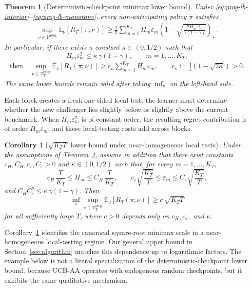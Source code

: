 \documentclass[
  12pt]{article}
\newtheorem{theorem}{Theorem}
\newtheorem{corollary}{Corollary}
\begin{document}
\begin{theorem}[Deterministic-checkpoint minimax lower bound]
\label{thm:prog-lb-general}
Under \eqref{eq:prog-lb-interior}--\eqref{eq:prog-lb-monotone}, every non-anticipating policy
$\pi$ satisfies
\begin{align}
\sup_{\nu\in\mathcal V_T^{\mathrm{prog}}}
\mathbb E_\nu[R_T(\pi;\nu)]
\ge
\frac12
\sum_{m=1}^{K_T}
H_m\varepsilon_m
\left(
1-
\sqrt{
\frac{2H_m\varepsilon_m^2}{\gamma(1-\gamma)}
}
\right)_+ .
    \label{eq:prog-lb-kl-simple}
\end{align}
In particular, if there exists a constant $\kappa\in(0,1/2)$ such that
\[
H_m\varepsilon_m^2
\le
\kappa\,\gamma(1-\gamma),
\qquad
m=1,\dots,K_T,
\]
\begin{align}
    \text{then}\quad \sup_{\nu\in\mathcal V_T^{\mathrm{prog}}}
\mathbb E_\nu[R_T(\pi;\nu)]
\ge
c_\kappa
\sum_{m=1}^{K_T} H_m\varepsilon_m,
\qquad
c_\kappa:=\frac12(1-\sqrt{2\kappa})>0.
\label{eq:prog-lb-clean}
\end{align}
The same lower bounds remain valid after taking $\inf_\pi$ on the left-hand side.
\end{theorem}

Each block creates a fresh one-sided local test: the learner must determine whether the new
challenger lies slightly below or slightly above the current benchmark. When
$H_m\varepsilon_m^2$ is of constant order, the resulting regret contribution is of order
$H_m\varepsilon_m$, and these local-testing costs add across blocks.

\begin{corollary}[$\sqrt{K_TT}$ lower bound under near-homogeneous local tests]
\label{cor:prog-lb-sqrtKT}
Under the assumptions of Theorem~\ref{thm:prog-lb-general}, assume in addition that there
exist constants $c_H,C_H,c_\varepsilon,C_\varepsilon>0$ and $\kappa\in(0,1/2)$ such that, for
every $m=1,\dots,K_T$,
\[
c_H\,\frac{T}{K_T}
\le
H_m
\le
C_H\,\frac{T}{K_T},
\qquad
c_\varepsilon\sqrt{\frac{K_T}{T}}
\le
\varepsilon_m
\le
C_\varepsilon\sqrt{\frac{K_T}{T}},
\]
and
\(
C_HC_\varepsilon^2\le \kappa\,\gamma(1-\gamma).
\)
Then
\[
\inf_\pi\sup_{\nu\in\mathcal V_T^{\mathrm{prog}}}
\mathbb E_\nu[R_T(\pi;\nu)]
\ge
c\,\sqrt{K_TT}
\]
for all sufficiently large $T$, where $c>0$ depends only on $c_H,c_\varepsilon,$ and $\kappa$.
\end{corollary}

Corollary~\ref{cor:prog-lb-sqrtKT} identifies the canonical square-root minimax scale in a
near-homogeneous local-testing regime. Our general upper bound in
Section~\ref{sec:algorithm} matches this dependence up to logarithmic factors. The example
below is not a literal specialization of the deterministic-checkpoint lower bound, because
UCB-AA operates with endogenous random checkpoints, but it exhibits the same qualitative
mechanism.
\end{document}
